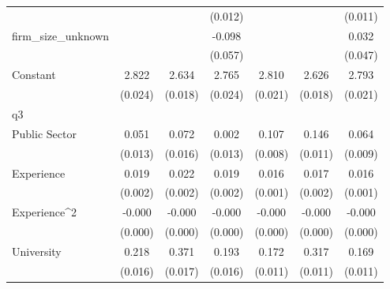 {\begin{tabular}{l*{6}{c}}
                    &                     &                     &     (0.012)         &                     &                     &     (0.011)         \\
firm\_size\_unknown   &                     &                     &      -0.098\sym{*}  &                     &                     &       0.032         \\
                    &                     &                     &     (0.057)         &                     &                     &     (0.047)         \\
Constant            &       2.822\sym{***}&       2.634\sym{***}&       2.765\sym{***}&       2.810\sym{***}&       2.626\sym{***}&       2.793\sym{***}\\
                    &     (0.024)         &     (0.018)         &     (0.024)         &     (0.021)         &     (0.018)         &     (0.021)         \\
\hline
q3                  &                     &                     &                     &                     &                     &                     \\
Public Sector       &       0.051\sym{***}&       0.072\sym{***}&       0.002         &       0.107\sym{***}&       0.146\sym{***}&       0.064\sym{***}\\
                    &     (0.013)         &     (0.016)         &     (0.013)         &     (0.008)         &     (0.011)         &     (0.009)         \\
Experience          &       0.019\sym{***}&       0.022\sym{***}&       0.019\sym{***}&       0.016\sym{***}&       0.017\sym{***}&       0.016\sym{***}\\
                    &     (0.002)         &     (0.002)         &     (0.002)         &     (0.001)         &     (0.002)         &     (0.001)         \\
Experience^{2}      &      -0.000\sym{***}&      -0.000\sym{***}&      -0.000\sym{***}&      -0.000\sym{***}&      -0.000\sym{***}&      -0.000\sym{***}\\
                    &     (0.000)         &     (0.000)         &     (0.000)         &     (0.000)         &     (0.000)         &     (0.000)         \\
University          &       0.218\sym{***}&       0.371\sym{***}&       0.193\sym{***}&       0.172\sym{***}&       0.317\sym{***}&       0.169\sym{***}\\
                    &     (0.016)         &     (0.017)         &     (0.016)         &     (0.011)         &     (0.011)         &     (0.011)         \\

\end{tabular}}
